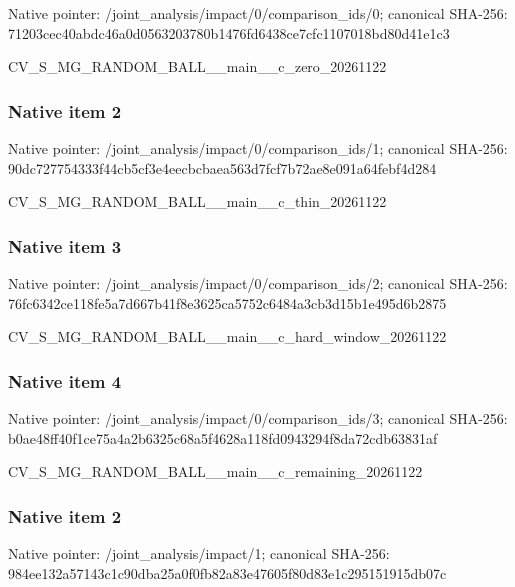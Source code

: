 \documentclass[10pt,a4paper]{article}
\begin{document}
Native pointer: /joint\_analysis/impact/0\allowbreak{}/comparison\_ids/0; canonical SHA-256: 71203cec40abdc46a0d05632\allowbreak{}03780b1476fd6438ce7cfc11\allowbreak{}07018bd80d41e1c3


CV\_S\_MG\_RANDOM\_BALL\_\_mai\allowbreak{}n\_\_c\_zero\_20261122


\subsubsection{Native item 2}


Native pointer: /joint\_analysis/impact/0\allowbreak{}/comparison\_ids/1; canonical SHA-256: 90dc727754333f44cb5cf3e4\allowbreak{}eecbcbaea563d7fcf7b72ae8\allowbreak{}e091a64febf4d284


CV\_S\_MG\_RANDOM\_BALL\_\_mai\allowbreak{}n\_\_c\_thin\_20261122


\subsubsection{Native item 3}


Native pointer: /joint\_analysis/impact/0\allowbreak{}/comparison\_ids/2; canonical SHA-256: 76fc6342ce118fe5a7d667b4\allowbreak{}1f8e3625ca5752c6484a3cb3\allowbreak{}d15b1e495d6b2875


CV\_S\_MG\_RANDOM\_BALL\_\_mai\allowbreak{}n\_\_c\_hard\_window\_2026112\allowbreak{}2


\subsubsection{Native item 4}


Native pointer: /joint\_analysis/impact/0\allowbreak{}/comparison\_ids/3; canonical SHA-256: b0ae48ff40f1ce75a4a2b632\allowbreak{}5c68a5f4628a118fd0943294\allowbreak{}f8da72cdb63831af


CV\_S\_MG\_RANDOM\_BALL\_\_mai\allowbreak{}n\_\_c\_remaining\_20261122


\subsubsection{Native item 2}


Native pointer: /joint\_analysis/impact/1; canonical SHA-256: 984ee132a57143c1c90dba25\allowbreak{}a0f0fb82a83e47605f80d83e\allowbreak{}1c295151915db07c
\end{document}
